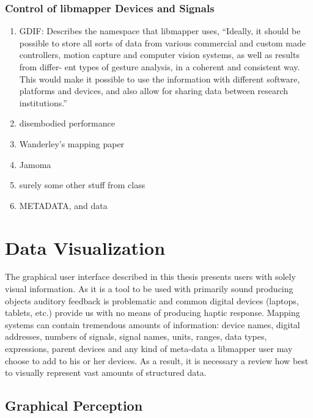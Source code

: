	\subsubsection{Control of libmapper Devices and Signals}
\begin{enumerate}
	\item GDIF:  Describes the namespace that libmapper uses, ``Ideally, it should be possible to store all sorts of data from various commercial and custom made controllers, motion capture and computer vision systems, as well as results from differ- ent types of gesture analysis, in a coherent and consistent way. This would make it possible to use the information with different software, platforms and devices, and also allow for sharing data between research institutions.'' 
	\item disembodied performance
	\item Wanderley's mapping paper  
	\item Jamoma 
	\item surely some other stuff from class
	\item METADATA, and data
\end{enumerate}

			\section{Data Visualization}


The graphical user interface described in this thesis presents users with solely visual information. As it is a tool to be used with primarily sound producing objects auditory feedback is problematic and common digital devices (laptops, tablets, etc.) provide us with no means of producing haptic response. Mapping systems can contain tremendous amounts of information: device names, digital addresses, numbers of signals, signal names, units, ranges, data types, expressions, parent devices and any kind of meta-data a libmapper user may choose to add to his or her devices. As a result, it is necessary a review how best to visually represent vast amounts of structured data.

	\subsection{Graphical Perception}
